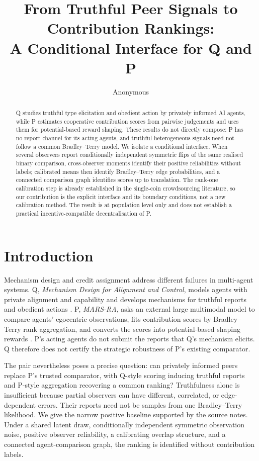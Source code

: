 \documentclass{article}
\title{From Truthful Peer Signals to Contribution Rankings:\\A Conditional Interface for Q and P}
\author{Anonymous}
\date{}
\begin{document}
\sloppy
\maketitle

\begin{abstract}
Q studies truthful type elicitation and obedient action by privately informed AI agents, while P estimates cooperative contribution scores from pairwise judgements and uses them for potential-based reward shaping.  These results do not directly compose: P has no report channel for its acting agents, and truthful heterogeneous signals need not follow a common Bradley--Terry model. %
We isolate a conditional interface.  When several observers report conditionally independent symmetric flips of the same realised binary comparison, cross-observer moments identify their positive reliabilities without labels; calibrated means then identify Bradley--Terry edge probabilities, and a connected comparison graph identifies scores up to translation. %
The rank-one calibration step is already established in the single-coin crowdsourcing literature, so our contribution is the explicit interface and its boundary conditions, not a new calibration method.  The result is at population level only and does not establish a practical incentive-compatible decentralisation of P. %
\end{abstract}

\section{Introduction}

Mechanism design and credit assignment address different failures in multi-agent systems.  Q, \emph{Mechanism Design for Alignment and Control}, models agents with private alignment and capability and develops mechanisms for truthful reports and obedient actions \cite{bergemann2026mechanism}. %
P, \emph{MARS-RA}, asks an external large multimodal model to compare agents' egocentric observations, fits contribution scores by Bradley--Terry rank aggregation, and converts the scores into potential-based shaping rewards \cite{wang2026mars}. %
P's acting agents do not submit the reports that Q's mechanism elicits.  Q therefore does not certify the strategic robustness of P's existing comparator. %

The pair nevertheless poses a precise question: can privately informed peers replace P's trusted comparator, with Q-style scoring inducing truthful reports and P-style aggregation recovering a common ranking? %
Truthfulness alone is insufficient because partial observers can have different, correlated, or edge-dependent errors.  Their reports need not be samples from one Bradley--Terry likelihood. %
We give the narrow positive baseline supported by the source notes.  Under a shared latent draw, conditionally independent symmetric observation noise, positive observer reliability, a calibrating overlap structure, and a connected agent-comparison graph, the ranking is identified without contribution labels. %
\end{document}
